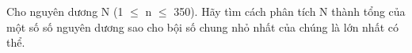Cho nguyên dương N (1 $\le$ n $\le$ 350). Hãy tìm cách phân tích N thành tổng của một số số nguyên dương sao cho bội số chung nhỏ nhất của chúng là lớn nhất có thể.  

\